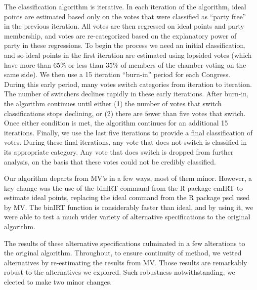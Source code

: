 \documentclass[12pt]{article}
\begin{document}
The classification algorithm is iterative.
In each iteration of the algorithm, ideal points are estimated based only on the
votes that were classified as ``party free'' in the previous iteration.
All votes are then regressed on ideal points and party membership, and votes are
re-categorized based on the explanatory power of party in these regressions.
To begin the process we need an initial classification, and so ideal points in
the first iteration are estimated using lopsided votes (which have more than
65\% or less than 35\% of members of the chamber voting on the same side).
We then use a 15 iteration ``burn-in'' period for each Congress.
During this early period, many votes switch categories from iteration to
iteration.
The number of switchers declines rapidly in these early iterations.
After burn-in, the algorithm continues until either (1) the number of votes that
switch classifications stops declining, or (2) there are fewer than five votes
that switch.
Once either condition is met, the algorithm continues for an additional 15
iterations.
Finally, we use the last five iterations to provide a final classification of
votes.
During these final iterations, any vote that does not switch is classified in
its appropriate category.
Any vote that does switch is dropped from further analysis, on the basis that
these votes could not be credibly classified.

Our algorithm departs from MV's in a few ways, most of them minor.
However, a key change was the use of the \textsf{binIRT} command from the
\textsf{R} package \textsf{emIRT} \citep{Imai:2016} to estimate ideal points,
replacing the \textsf{ideal} command from the \textsf{R} package \textsf{pscl}
\citep{Jackman:2015} used by MV.
The \textsf{binIRT} function is considerably faster than \textsf{ideal}, and by
using it, we were able to test a much wider variety of alternative
specifications to the original algorithm.

The results of these alternative specifications culminated in a few alterations
to the original algorithm.
Throughout, to ensure continuity of method, we vetted alternatives by
re-estimating the results from MV.
Those results are remarkably robust to the alternatives we explored.
Such robustness notwithstanding, we elected to make two minor changes.
\end{document}
